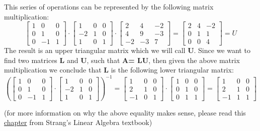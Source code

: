 \documentclass[11pt,a4paper,oneside]{report}
\begin{document}
\begin{framed}
This series of operations can be represented by the following matrix multiplication:
\[
\begin{bmatrix}
1 & 0 & 0\\
0 & 1 & 0\\
0 & -1 & 1
\end{bmatrix}
\cdot
\begin{bmatrix}
1 & 0 & 0\\
-2 & 1 & 0\\
1 & 0 & 1
\end{bmatrix}
\cdot
\begin{bmatrix}
2 & 4 &-2\\
4 & 9 &-3\\
-2 &-3 & 7
\end{bmatrix}
=
\begin{bmatrix}
2 & 4 &-2\\
0 & 1 & 1\\
0 & 0 & 4
\end{bmatrix}
=U
\]
The result is an upper triangular matrix which we will call {\bf U}. Since we want to find two matrices {\bf L} and {\bf U}, such that {\bf A= LU}, then given the above matrix multiplication we conclude that {\bf L} is the following lower triangular matrix:
\[
\left(
\begin{bmatrix}
1 & 0 & 0\\
0 & 1 & 0\\
0 & -1 & 1
\end{bmatrix}
\cdot
\begin{bmatrix}
1 & 0 & 0\\
-2 & 1 & 0\\
1 & 0 & 1
\end{bmatrix}
\right)^{-1} =
\begin{bmatrix}
1 & 0 & 0\\
2 & 1 & 0\\
-1 & 0 & 1
\end{bmatrix}
\cdot
\begin{bmatrix}
1 & 0 & 0\\
0 & 1 & 0\\
0 & 1 & 1
\end{bmatrix}
= 
\begin{bmatrix}
1 & 0 & 0\\
2 & 1 & 0\\
-1 & 1 & 1
\end{bmatrix}
\]

{\small (for more information on why the above equality makes sense, please read this \href{http://math.mit.edu/linearalgebra/ila0205.pdf}{chapter} from Strang's Linear Algebra textbook)}\\


\end{framed}
\end{document}

